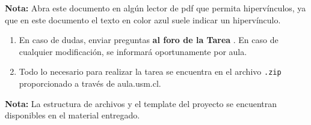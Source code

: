 
\begin{mdframed}[linecolor=blue!60!black, backgroundcolor=blue!5,
                 linewidth=1pt, roundcorner=5pt, innertopmargin=8pt,
                 innerbottommargin=8pt]
\textbf{Nota: }Abra este documento en algún lector de pdf que permita hipervínculos, ya que en este documento el texto en color azul suele indicar un hipervínculo.
\end{mdframed}

\begin{enumerate}[(1)]
  \item En caso de dudas, enviar preguntas \textbf{al foro de la Tarea \tnum}. En caso de cualquier modificación, se informará oportunamente por aula.
  \item Todo lo necesario para realizar la tarea se encuentra en el archivo \verb|.zip| proporcionado a través de aula.usm.cl.
\end{enumerate}

\begin{mdframed}[linecolor=blue!60!black, backgroundcolor=blue!5,
                 linewidth=1pt, roundcorner=5pt, innertopmargin=8pt,
                 innerbottommargin=8pt]
                 \textbf{Nota:} La estructura de archivos y el template del proyecto se encuentran disponibles en el material entregado.
\end{mdframed}

\newpage

